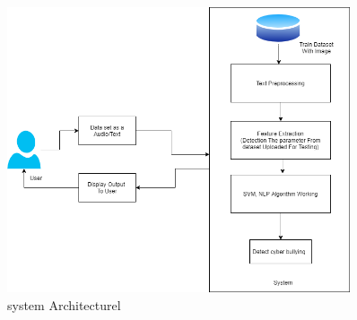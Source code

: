 \documentclass[oneside,a4paper,12pt]{report}
\begin{document}
\begin{figure}[h]
	\centering
		\includegraphics[width=0.90\textwidth]{system architecture.png}
	\caption {system Architecturel}
	\end{figure}\\
\end{document}

